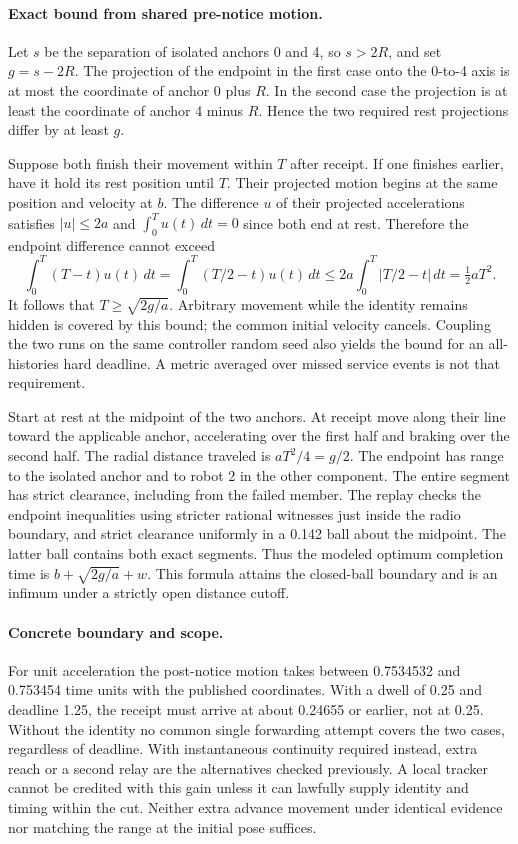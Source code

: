 \documentclass[11pt]{article}
\begin{document}
\paragraph{Exact bound from shared pre-notice motion.}
Let $s$ be the separation of isolated anchors 0 and 4, so $s>2R$, and set $g=s-2R$. The projection of the endpoint in the first case onto the 0-to-4 axis is at most the coordinate of anchor 0 plus $R$. In the second case the projection is at least the coordinate of anchor 4 minus $R$. Hence the two required rest projections differ by at least $g$.

Suppose both finish their movement within $T$ after receipt. If one finishes earlier, have it hold its rest position until $T$. Their projected motion begins at the same position and velocity at $b$. The difference $u$ of their projected accelerations satisfies $|u|\le2a$ and $\int_0^T u(t)\,dt=0$ since both end at rest. Therefore the endpoint difference cannot exceed
\[
 \int_0^T(T-t)u(t)\,dt
 =\int_0^T(T/2-t)u(t)\,dt
 \le 2a\int_0^T|T/2-t|\,dt=\tfrac12 aT^2.
\]
It follows that $T\ge\sqrt{2g/a}$. Arbitrary movement while the identity remains hidden is covered by this bound; the common initial velocity cancels. Coupling the two runs on the same controller random seed also yields the bound for an all-histories hard deadline. A metric averaged over missed service events is not that requirement.

Start at rest at the midpoint of the two anchors. At receipt move along their line toward the applicable anchor, accelerating over the first half and braking over the second half. The radial distance traveled is $aT^2/4=g/2$. The endpoint has range to the isolated anchor and to robot 2 in the other component. The entire segment has strict clearance, including from the failed member. The replay checks the endpoint inequalities using stricter rational witnesses just inside the radio boundary, and strict clearance uniformly in a 0.142 ball about the midpoint. The latter ball contains both exact segments. Thus the modeled optimum completion time is $b+\sqrt{2g/a}+w$. This formula attains the closed-ball boundary and is an infimum under a strictly open distance cutoff.

\paragraph{Concrete boundary and scope.}
For unit acceleration the post-notice motion takes between 0.7534532 and 0.753454 time units with the published coordinates. With a dwell of 0.25 and deadline 1.25, the receipt must arrive at about 0.24655 or earlier, not at 0.25. Without the identity no common single forwarding attempt covers the two cases, regardless of deadline. With instantaneous continuity required instead, extra reach or a second relay are the alternatives checked previously. A local tracker cannot be credited with this gain unless it can lawfully supply identity and timing within the cut. Neither extra advance movement under identical evidence nor matching the range at the initial pose suffices.
\end{document}

